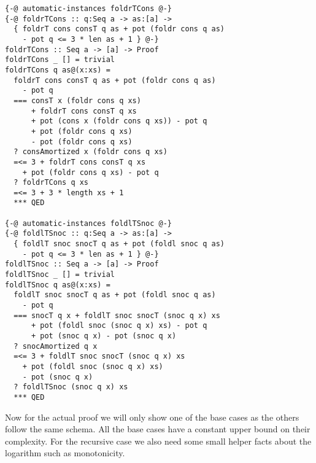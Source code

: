 \documentclass[sigplan,screen]{acmart}
\begin{document}
\begin{lstlisting}
{-@ automatic-instances foldrTCons @-}
{-@ foldrTCons :: q:Seq a -> as:[a] ->
  { foldrT cons consT q as + pot (foldr cons q as)
    - pot q <= 3 * len as + 1 } @-}
foldrTCons :: Seq a -> [a] -> Proof
foldrTCons _ [] = trivial
foldrTCons q as@(x:xs) =
  foldrT cons consT q as + pot (foldr cons q as)
    - pot q
  === consT x (foldr cons q xs)
      + foldrT cons consT q xs
      + pot (cons x (foldr cons q xs)) - pot q
      + pot (foldr cons q xs)
      - pot (foldr cons q xs)
  ? consAmortized x (foldr cons q xs)
  =<= 3 + foldrT cons consT q xs
    + pot (foldr cons q xs) - pot q
  ? foldrTCons q xs
  =<= 3 + 3 * length xs + 1
  *** QED

{-@ automatic-instances foldlTSnoc @-}
{-@ foldlTSnoc :: q:Seq a -> as:[a] ->
  { foldlT snoc snocT q as + pot (foldl snoc q as)
    - pot q <= 3 * len as + 1 } @-}
foldlTSnoc :: Seq a -> [a] -> Proof
foldlTSnoc _ [] = trivial
foldlTSnoc q as@(x:xs) =
  foldlT snoc snocT q as + pot (foldl snoc q as)
    - pot q
  === snocT q x + foldlT snoc snocT (snoc q x) xs
      + pot (foldl snoc (snoc q x) xs) - pot q
      + pot (snoc q x) - pot (snoc q x)
  ? snocAmortized q x
  =<= 3 + foldlT snoc snocT (snoc q x) xs
    + pot (foldl snoc (snoc q x) xs)
    - pot (snoc q x)
  ? foldlTSnoc (snoc q x) xs
  *** QED
\end{lstlisting}

Now for the actual proof we will only show one of the base cases as the others follow the same schema. All the base cases have a constant upper bound on their complexity. For the recursive case we also need some small helper facts about the logarithm such as monotonicity.
\end{document}
